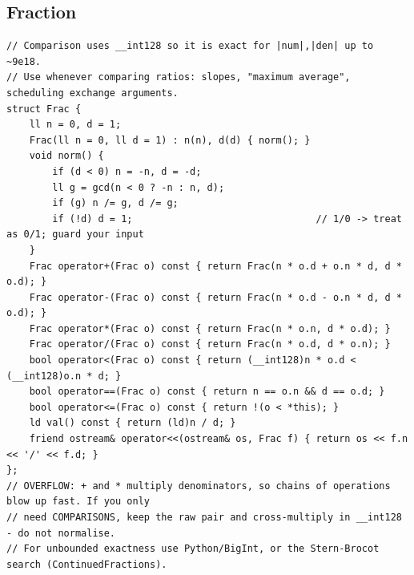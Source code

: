 \documentclass[9pt,a4paper,twocolumn]{extarticle}
\begin{document}
\filbreak
\subsection{Fraction}
\nopagebreak
\begin{lstlisting}
// Comparison uses __int128 so it is exact for |num|,|den| up to ~9e18.
// Use whenever comparing ratios: slopes, "maximum average", scheduling exchange arguments.
struct Frac {
    ll n = 0, d = 1;
    Frac(ll n = 0, ll d = 1) : n(n), d(d) { norm(); }
    void norm() {
        if (d < 0) n = -n, d = -d;
        ll g = gcd(n < 0 ? -n : n, d);
        if (g) n /= g, d /= g;
        if (!d) d = 1;                                // 1/0 -> treat as 0/1; guard your input
    }
    Frac operator+(Frac o) const { return Frac(n * o.d + o.n * d, d * o.d); }
    Frac operator-(Frac o) const { return Frac(n * o.d - o.n * d, d * o.d); }
    Frac operator*(Frac o) const { return Frac(n * o.n, d * o.d); }
    Frac operator/(Frac o) const { return Frac(n * o.d, d * o.n); }
    bool operator<(Frac o) const { return (__int128)n * o.d < (__int128)o.n * d; }
    bool operator==(Frac o) const { return n == o.n && d == o.d; }
    bool operator<=(Frac o) const { return !(o < *this); }
    ld val() const { return (ld)n / d; }
    friend ostream& operator<<(ostream& os, Frac f) { return os << f.n << '/' << f.d; }
};
// OVERFLOW: + and * multiply denominators, so chains of operations blow up fast. If you only
// need COMPARISONS, keep the raw pair and cross-multiply in __int128 - do not normalise.
// For unbounded exactness use Python/BigInt, or the Stern-Brocot search (ContinuedFractions).
\end{lstlisting}

\filbreak
\end{document}
